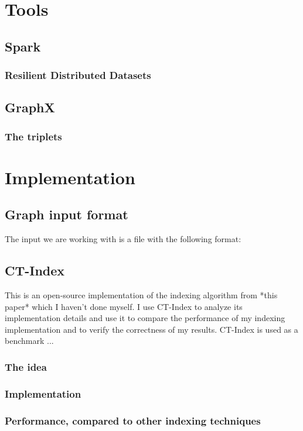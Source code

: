 \documentclass{l4proj}
\theoremstyle{definition}
\begin{document}
\chapter{Tools}
    \section{Spark}
        \subsection{Resilient Distributed Datasets}
    \section{GraphX}
        \subsection{The triplets}

\chapter{Implementation}
    \section{Graph input format}
    The input we are working with is a file with the following format:\newline
    
    
    
\section{CT-Index}
    
    This is an open-source implementation of the indexing algorithm from *this paper* which I haven't done myself. I use CT-Index to analyze its implementation details and use it to compare the performance of my indexing implementation and to verify the correctness of my results. CT-Index is used as a benchmark ... 
    \subsection{The idea}
    
    \subsection{Implementation}
    
    \subsection{Performance, compared to other indexing techniques}
    
\end{document}
